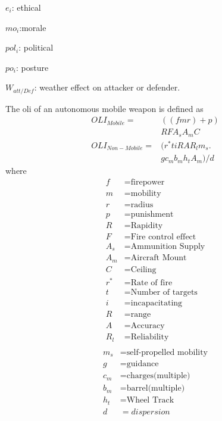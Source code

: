 \documentclass[]{article}
\begin{document}
    $e_i$: ethical
    
    $mo_i$:morale \cite{Moraled90c4876-e2f0-39fb-b021-9e98ca8fbee3}

    $pol_i$: political
    
    $po_i$: posture
    
    $W_{att/Def}$: weather effect on attacker or defender.

    The \acrshort{oli} of an autonomous mobile weapon is defined as
\begin{equation}
\begin{split}
         OLI_{Mobile}=&((fmr)+p)\\&RFA_sA_mC\\   
        OLI_{Non-Mobile}=&(r^*tiRAR_lm_s.\\&gc_mb_mh_tA_m)/d
\end{split}
\end{equation}
     where
    \begin{align*}
     f&=\text{firepower}\\
     m&=\text{mobility}\\
     r&=\text{radius}\\
     p&=\text{punishment}\\
     R&=\text{Rapidity}\\
     F&=\text{Fire control effect}\\
     A_s&=\text{Ammunition Supply}\\
     A_m&=\text{Aircraft Mount}\\
     C&=\text{Ceiling}\\
     r^*&=\text{Rate of fire}\\
     t&=\text{Number of targets}\\
     i&=\text{incapacitating}\\
     R&=\text{range}\\
     A&=\text{Accuracy}\\
     R_l&=\text{Reliability}\\
    \end{align*}
    \begin{align*}
     m_s&=\text{self-propelled mobility}\\
     g&=\text{guidance}\\
     c_m&=\text{charges(multiple)}\\
     b_m&=\text{barrel(multiple)}\\
     h_t&=\text{Wheel Track}\\
     d&={dispersion}
    \end{align*}
   
\end{document}
